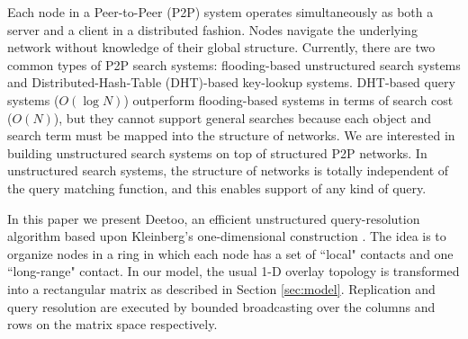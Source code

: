 \documentclass[conference]{IEEEtran}
\begin{document}
Each node in a Peer-to-Peer (P2P) system operates simultaneously as both a server and a client
in a distributed fashion. Nodes navigate the
underlying network without knowledge of their global structure. 
Currently, there are two common types of P2P search systems: flooding-based
unstructured search systems and Distributed-Hash-Table (DHT)-based key-lookup systems. 
DHT-based query systems ($O(\log N)$) outperform flooding-based systems in terms of 
search cost ($O(N)$), but they cannot support general searches because each object
and search term must be mapped into the structure of networks.
We are interested in building unstructured search systems on top of 
structured P2P networks. In unstructured search systems, 
the structure of networks is totally independent of the query matching 
function, and this enables support of any kind of query.  

In this paper we present Deetoo, an efficient unstructured query-resolution 
algorithm based upon Kleinberg's one-dimensional construction
\cite{jk:Algorithmic}. The idea is to organize nodes in a ring in which 
each node has a set of ``local" contacts and one ``long-range" 
contact. 
In our model, the usual 1-D
overlay topology is transformed into a rectangular 
matrix as described in Section \ref{sec:model}.  Replication and 
query resolution are executed by bounded broadcasting over the 
columns and rows on the matrix space respectively.
\end{document}
